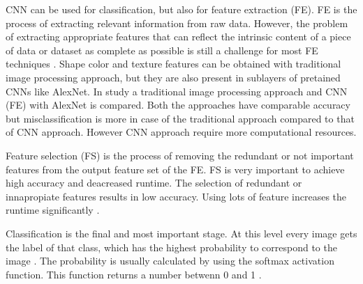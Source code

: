 CNN can be used for classification, but also for feature extraction (FE). FE is the process of extracting relevant information from raw data. However, the problem of extracting appropriate features that can reflect the intrinsic content of a piece of data or dataset as complete as possible is still a challenge for most FE techniques
. Shape color and texture features can be obtained with traditional image processing approach, but they are also present in sublayers of pretained CNNs like AlexNet.
In 
study a traditional image processing approach and CNN (FE) with AlexNet is compared. Both the approaches have comparable accuracy but misclassification is more in case of the traditional approach compared to that of CNN approach. However
 CNN approach require more computational resources.

Feature selection (FS) is the process of removing the redundant or not important features from the output feature set of the FE. FS is very important to achieve high accuracy and deacreased runtime. The selection of redundant or innapropiate features results in low accuracy. Using lots of feature increases the runtime significantly
.

Classification is the final and most important stage. At this level every image gets the label of that class, which has the highest probability to correspond to the image
. The probability is usually calculated by using the softmax activation function. This function returns a number betwenn 0 and 1
. 

